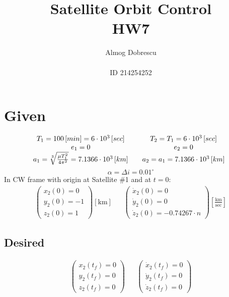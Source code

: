 \documentclass[11pt, a4paper]{article}
\title{Satellite Orbit Control \\ HW7}
\author{Almog Dobrescu\\\\ID 214254252}
\begin{document}
\maketitle

\thispagestyle{empty}
\newpage
\setcounter{page}{1}

\tableofcontents
\vfil
\listoffigures
\newpage

\section{Given}
\begin{equation*}
    \begin{matrix}
        T_1=100\left[min\right] = 6\cdot10^3\left[sec\right] && T_2 = T_1 = 6\cdot10^3\left[sec\right] \\
        e_1 = 0 && e_2 = 0 \\
        a_1 = \sqrt[3]{\frac{\mu T_1^2}{4\pi^2}} = 7.1366\cdot10^3\left[km\right] && a_2 = a_1 = 7.1366\cdot10^3\left[km\right]
    \end{matrix}\\
\end{equation*}
\begin{equation*}
    \alpha=\Delta i = 0.01^\circ
\end{equation*}
In CW frame with origin at Satellite \#1 and at $t=0$:
\begin{equation*}
    \begin{matrix}
    \begin{pmatrix}
        x_2(0)=0 \\ y_2(0)=-1 \\ z_2(0)=1
    \end{pmatrix}\left[\mathrm{km}\right] &&
    \begin{pmatrix}
        \dot{x}_2(0)=0 \\ \dot{y}_2(0) =0 \\ \dot{z}_2(0)=-0.74267\cdot n
    \end{pmatrix}\displaystyle\left[\frac{\mathrm{km}}{\mathrm{sec}}\right]
    \end{matrix}
\end{equation*}

\subsection{Desired}
\begin{equation*}
    \begin{matrix}
    \begin{pmatrix}
        x_2(t_f)=0 \\ y_2(t_f)=0 \\ z_2(t_f)=0
    \end{pmatrix} &&
    \begin{pmatrix}
        \dot{x}_2(t_f)=0 \\ \dot{y}_2(t_f)=0 \\ \dot{z}_2(t_f)=0
    \end{pmatrix}
    \end{matrix}
\end{equation*}
\end{document}
